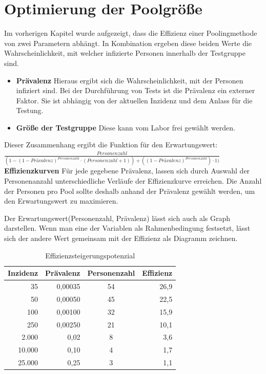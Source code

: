 \section{Optimierung der Poolgröße}
Im vorherigen Kapitel wurde aufgezeigt, dass die Effizienz einer Poolingmethode von zwei Parametern abhängt.
In Kombination ergeben diese beiden Werte die Wahrscheinlichkeit, mit welcher infizierte Personen innerhalb der Testgruppe sind.
\begin{itemize}
	\item \textbf{Prävalenz} Hieraus ergibt sich die Wahrscheinlichkeit, mit der Personen infiziert sind.
	Bei der Durchführung von Tests ist die Prävalenz ein externer Faktor.
	Sie ist abhängig von der aktuellen Inzidenz und dem Anlass für die Testung.
	\item \textbf{Größe der Testgruppe} Diese kann vom Labor frei gewählt werden.
\end{itemize}

Dieser Zusammenhang ergibt die Funktion für den Erwartungswert:\newline
$\frac{Personenzahl}{(1 - (1-Prävalenz)^{Personenzahl} \cdot (Personenzahl + 1)) + ((1-Prävalenz)^{Personenzahl}) \cdot 1)}$
\newline
\newline
\textbf{Effizienzkurven}\newline
Für jede gegebene Prävalenz, lassen sich durch Auswahl der Personenanzahl unterschiedliche Verläufe der Effizienzkurve erreichen.
Die Anzahl der Personen pro Pool sollte deshalb anhand der Prävalenz gewählt werden, um den Erwartungswert zu maximieren.

Der Erwartungswert(Personenzahl, Prävalenz) lässt sich auch als Graph darstellen.
Wenn man eine der Variablen als Rahmenbedingung festsetzt, lässt sich der andere Wert gemeinsam mit der Effizienz als Diagramm zeichnen.

\begin{table}[h]
	\centering
	\begin{tabular}{|r|r|c|r|}
		\hline
		Inzidenz&Prävalenz&Personenzahl &Effizienz\\
		\hline
		35 & 0,00035 & 54 & 26,9\\
		\hline
		50 & 0,00050 & 45 & 22,5 \\
		\hline
		100 & 0,00100 & 32 & 15,9 \\
		\hline
		250 & 0,00250 & 21 & 10,1 \\
		\hline
		2.000 & 0,02 & 8 & 3,6\\
		\hline
		10.000 & 0,10  & 4 & 1,7\\
		\hline
		25.000 & 0,25 & 3 & 1,1\\
		\hline
	\end{tabular}
	\caption{Effizienzsteigerungspotenzial\footnotemark}
\end{table} 

